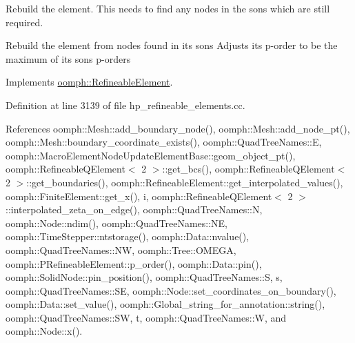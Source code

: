 Rebuild the element. This needs to find any nodes in the sons which are still required.

Rebuild the element from nodes found in its sons Adjusts its p-\/order to be the maximum of its sons\textquotesingle{} p-\/orders 

Implements \hyperlink{classoomph_1_1RefineableElement_a33324be27833fa4b78279d17158215fa}{oomph\+::\+Refineable\+Element}.



Definition at line 3139 of file hp\+\_\+refineable\+\_\+elements.\+cc.



References oomph\+::\+Mesh\+::add\+\_\+boundary\+\_\+node(), oomph\+::\+Mesh\+::add\+\_\+node\+\_\+pt(), oomph\+::\+Mesh\+::boundary\+\_\+coordinate\+\_\+exists(), oomph\+::\+Quad\+Tree\+Names\+::E, oomph\+::\+Macro\+Element\+Node\+Update\+Element\+Base\+::geom\+\_\+object\+\_\+pt(), oomph\+::\+Refineable\+Q\+Element$<$ 2 $>$\+::get\+\_\+bcs(), oomph\+::\+Refineable\+Q\+Element$<$ 2 $>$\+::get\+\_\+boundaries(), oomph\+::\+Refineable\+Element\+::get\+\_\+interpolated\+\_\+values(), oomph\+::\+Finite\+Element\+::get\+\_\+x(), i, oomph\+::\+Refineable\+Q\+Element$<$ 2 $>$\+::interpolated\+\_\+zeta\+\_\+on\+\_\+edge(), oomph\+::\+Quad\+Tree\+Names\+::N, oomph\+::\+Node\+::ndim(), oomph\+::\+Quad\+Tree\+Names\+::\+NE, oomph\+::\+Time\+Stepper\+::ntstorage(), oomph\+::\+Data\+::nvalue(), oomph\+::\+Quad\+Tree\+Names\+::\+NW, oomph\+::\+Tree\+::\+O\+M\+E\+GA, oomph\+::\+P\+Refineable\+Element\+::p\+\_\+order(), oomph\+::\+Data\+::pin(), oomph\+::\+Solid\+Node\+::pin\+\_\+position(), oomph\+::\+Quad\+Tree\+Names\+::S, s, oomph\+::\+Quad\+Tree\+Names\+::\+SE, oomph\+::\+Node\+::set\+\_\+coordinates\+\_\+on\+\_\+boundary(), oomph\+::\+Data\+::set\+\_\+value(), oomph\+::\+Global\+\_\+string\+\_\+for\+\_\+annotation\+::string(), oomph\+::\+Quad\+Tree\+Names\+::\+SW, t, oomph\+::\+Quad\+Tree\+Names\+::W, and oomph\+::\+Node\+::x().

\mbox{\label{classoomph_1_1PRefineableQElement_3_012_00_01INITIAL__NNODE__1D_01_4_a2ec50a2b731e5e8b969f116606cab6ca}} 
